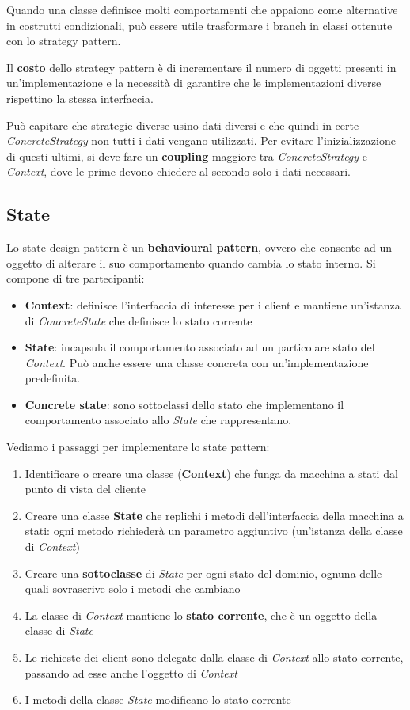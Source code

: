 \begin{note}
	Quando una classe definisce molti comportamenti che appaiono come alternative in costrutti condizionali, può essere utile trasformare i branch in classi ottenute con lo strategy pattern.
\end{note}

Il \textbf{costo} dello strategy pattern è di incrementare il numero di oggetti presenti in un'implementazione e la necessità di garantire che le implementazioni diverse rispettino la stessa interfaccia.

\begin{observation}
	Può capitare che strategie diverse usino dati diversi e che quindi in certe \textit{ConcreteStrategy} non tutti i dati vengano utilizzati. Per evitare l'inizializzazione di questi ultimi, si deve fare un \textbf{coupling} maggiore tra \textit{ConcreteStrategy} e \textit{Context}, dove le prime devono chiedere al secondo solo i dati necessari.
\end{observation}
\subsection{State}
Lo state design pattern è un \textbf{behavioural pattern}, ovvero che consente ad un oggetto di alterare il suo comportamento quando cambia lo stato interno. Si compone di tre partecipanti:
\begin{itemize}
	\item \textbf{Context}: definisce l'interfaccia di interesse per i client e mantiene un'istanza di \textit{ConcreteState} che definisce lo stato corrente
	\item \textbf{State}: incapsula il comportamento associato ad un particolare stato del \textit{Context}. Può anche essere una classe concreta con un'implementazione predefinita.
	\item \textbf{Concrete state}: sono sottoclassi dello stato che implementano il comportamento associato allo \textit{State} che rappresentano.
\end{itemize}
Vediamo i passaggi per implementare lo state pattern:
\begin{enumerate}
	\item Identificare o creare una classe (\textbf{Context}) che funga da macchina a stati dal punto di vista del cliente
	\item Creare una classe \textbf{State} che replichi i metodi dell'interfaccia della macchina a stati: ogni metodo richiederà un parametro aggiuntivo (un'istanza della classe di \textit{Context})
	\item Creare una \textbf{sottoclasse} di \textit{State} per ogni stato del dominio, ognuna delle quali sovrascrive solo i metodi che cambiano
	\item La classe di \textit{Context} mantiene lo \textbf{stato corrente}, che è un oggetto della classe di \textit{State}
	\item Le richieste dei client sono delegate dalla classe di \textit{Context} allo stato corrente, passando ad esse anche l'oggetto di \textit{Context}
	\item I metodi della classe \textit{State} modificano lo stato corrente
\end{enumerate}

